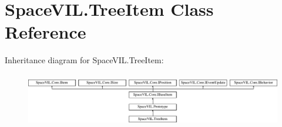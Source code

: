 \hypertarget{class_space_v_i_l_1_1_tree_item}{}\section{Space\+V\+I\+L.\+Tree\+Item Class Reference}
\label{class_space_v_i_l_1_1_tree_item}
Inheritance diagram for Space\+V\+I\+L.\+Tree\+Item\+:\begin{figure}[H]
\begin{center}
\leavevmode
\includegraphics[height=2.421622cm]{class_space_v_i_l_1_1_tree_item}
\end{center}
\end{figure}
